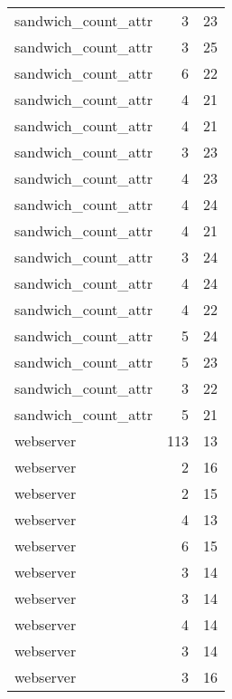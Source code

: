 \begin{table}
\begin{tabular}{lrr}
             sandwich\_count\_attr &         3 &        23 \\
             sandwich\_count\_attr &         3 &        25 \\
             sandwich\_count\_attr &         6 &        22 \\
             sandwich\_count\_attr &         4 &        21 \\
             sandwich\_count\_attr &         4 &        21 \\
             sandwich\_count\_attr &         3 &        23 \\
             sandwich\_count\_attr &         4 &        23 \\
             sandwich\_count\_attr &         4 &        24 \\
             sandwich\_count\_attr &         4 &        21 \\
             sandwich\_count\_attr &         3 &        24 \\
             sandwich\_count\_attr &         4 &        24 \\
             sandwich\_count\_attr &         4 &        22 \\
             sandwich\_count\_attr &         5 &        24 \\
             sandwich\_count\_attr &         5 &        23 \\
             sandwich\_count\_attr &         3 &        22 \\
             sandwich\_count\_attr &         5 &        21 \\
                       webserver &       113 &        13 \\
                       webserver &         2 &        16 \\
                       webserver &         2 &        15 \\
                       webserver &         4 &        13 \\
                       webserver &         6 &        15 \\
                       webserver &         3 &        14 \\
                       webserver &         3 &        14 \\
                       webserver &         4 &        14 \\
                       webserver &         3 &        14 \\
                       webserver &         3 &        16 \\

\end{tabular}
\end{table}
